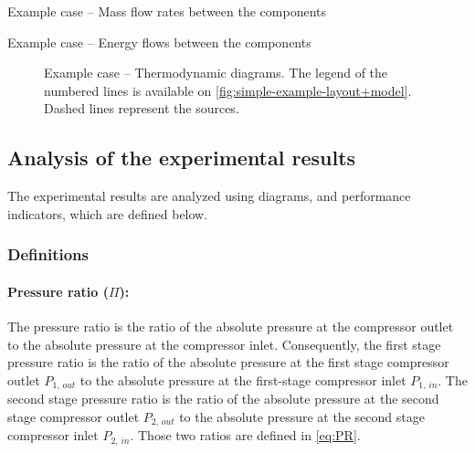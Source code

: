\begin{table}[htb]
    \footnotesize
    \begin{center}
    
  \end{center}
  \caption{Example case -- Mass flow rates between the components}
  \label{tab:simple-example-dotM}
\end{table}

\begin{table}[htb]
    \footnotesize
    \begin{center}
    
  \end{center}
  \caption{Example case -- Energy flows between the components}
  \label{tab:simple-example-dotEQ}
\end{table}

\begin{figure}[htb]
  \centering
  \hspace{1em}
  \caption[Example case -- Thermodynamic diagrams]{Example case --
    Thermodynamic diagrams. The legend of the numbered lines is
    available on \cref{fig:simple-example-layout+model}. Dashed lines
    represent the sources.}
  \label{fig:simple-example-diagrams}
\end{figure}

\subsection{Analysis of the experimental results}
\label{sec:methodo-analysis}

The experimental results are analyzed using diagrams, and performance
indicators, which are defined below.

\subsubsection{Definitions}
\label{sec:methodo-defs}

\paragraph{Pressure ratio ($\Pi$):}

The pressure ratio is the ratio of the absolute pressure at the
compressor outlet to the absolute pressure at the compressor
inlet. Consequently, the first stage pressure ratio is the ratio of
the absolute pressure at the first stage compressor outlet
$P_{1,\,out}$ to the absolute pressure at the first-stage compressor
inlet $P_{1,\,in}$. The second stage pressure ratio is the ratio of
the absolute pressure at the second stage compressor outlet
$P_{2,\,out}$ to the absolute pressure at the second stage compressor
inlet $P_{2,\,in}$. Those two ratios are defined in \cref{eq:PR}.

